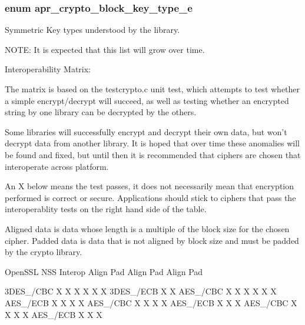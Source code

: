 \hypertarget{group___a_p_r___util___crypto_gac62c799021d3bc28449626e60351e946}{
\subsubsection[{apr\-\_\-crypto\-\_\-block\-\_\-key\-\_\-type\-\_\-e}]{\setlength{\rightskip}{0pt plus 5cm}enum {\bf apr\-\_\-crypto\-\_\-block\-\_\-key\-\_\-type\-\_\-e}}}\label{group___a_p_r___util___crypto_gac62c799021d3bc28449626e60351e946}
Symmetric Key types understood by the library.

N\-O\-T\-E\-: It is expected that this list will grow over time.

Interoperability Matrix\-:

The matrix is based on the testcrypto.\-c unit test, which attempts to test whether a simple encrypt/decrypt will succeed, as well as testing whether an encrypted string by one library can be decrypted by the others.

Some libraries will successfully encrypt and decrypt their own data, but won't decrypt data from another library. It is hoped that over time these anomalies will be found and fixed, but until then it is recommended that ciphers are chosen that interoperate across platform.

An X below means the test passes, it does not necessarily mean that encryption performed is correct or secure. Applications should stick to ciphers that pass the interoperablity tests on the right hand side of the table.

Aligned data is data whose length is a multiple of the block size for the chosen cipher. Padded data is data that is not aligned by block size and must be padded by the crypto library. \begin{DoxyVerb}             OpenSSL      NSS      Interop
            Align Pad  Align Pad  Align Pad
\end{DoxyVerb}
 3\-D\-E\-S\-\_/\-C\-B\-C X X X X X X 3\-D\-E\-S\-\_/\-E\-C\-B X X A\-E\-S\-\_/\-C\-B\-C X X X X X X A\-E\-S\-\_/\-E\-C\-B X X X X A\-E\-S\-\_/\-C\-B\-C X X X X A\-E\-S\-\_/\-E\-C\-B X X X A\-E\-S\-\_/\-C\-B\-C X X X X A\-E\-S\-\_/\-E\-C\-B X X X

